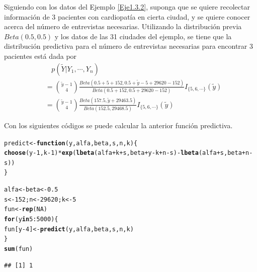 \documentclass[10pt,openright]{book}\usepackage[]{graphicx}\usepackage[]{color}
\makeatletter
\newcommand{\hlnum}[1]{\textcolor[rgb]{0.686,0.059,0.569}{#1}}%
\newcommand{\hlopt}[1]{\textcolor[rgb]{0,0,0}{#1}}%
\newcommand{\hlstd}[1]{\textcolor[rgb]{0.345,0.345,0.345}{#1}}%
\newcommand{\hlkwa}[1]{\textcolor[rgb]{0.161,0.373,0.58}{\textbf{#1}}}%
\newcommand{\hlkwb}[1]{\textcolor[rgb]{0.69,0.353,0.396}{#1}}%
\newcommand{\hlkwc}[1]{\textcolor[rgb]{0.333,0.667,0.333}{#1}}%
\newcommand{\hlkwd}[1]{\textcolor[rgb]{0.737,0.353,0.396}{\textbf{#1}}}%
\newenvironment{kframe}{%
 \def\at@end@of@kframe{}%
 \ifinner\ifhmode%
  \def\at@end@of@kframe{\end{minipage}}%
  \begin{minipage}{\columnwidth}%
 \fi\fi%
 \def\FrameCommand##1{\hskip\@totalleftmargin \hskip-\fboxsep
 \colorbox{shadecolor}{##1}\hskip-\fboxsep
     \hskip-\linewidth \hskip-\@totalleftmargin \hskip\columnwidth}%
 \MakeFramed {\advance\hsize-\width
   \@totalleftmargin\z@ \linewidth\hsize
   \@setminipage}}%
 {\par\unskip\endMakeFramed%
 \at@end@of@kframe}
\newenvironment{knitrout}{}{} %
\makeatother
\begin{document}
    \begin{Eje}
    Siguiendo con los datos del Ejemplo \ref{Eje1.3.2}, suponga que se quiere recolectar informaci\'on de 3 pacientes con cardiopat\'ia en cierta ciudad, y se quiere conocer acerca del n\'umero de entrevistas necesarias. Utilizando la distribuci\'on previa $Beta(0.5,0.5)$ y los datos de las 31 ciudades del ejemplo, se tiene que la distribuci\'on predictiva para el n\'umero de entrevistas necesarias para encontrar 3 pacientes est\'a dada por
    \begin{align*}
    &\ \ \ \ p(\tilde{Y}|Y_1,\cdots,Y_n)\\
    &=\binom{\tilde{y}-1}{4}\frac{Beta(0.5+5+152,0.5+\tilde{y}-5+29620-152)}{Beta(0.5+152,0.5+29620-152)}I_{\{5,6,\cdots\}}(\tilde{y})\\
    &=\binom{\tilde{y}-1}{4}\frac{Beta(157.5,\tilde{y}+29463.5)}{Beta(152.5,29468.5)}I_{\{5,6,\cdots\}}(\tilde{y})
    \end{align*}
    
    Con los siguientes c\'odigos se puede calcular la anterior funci\'on predictiva.
    
\begin{knitrout}
\color{fgcolor}\begin{kframe}
\begin{alltt}
\hlstd{predict}\hlkwb{<-}\hlkwa{function}\hlstd{(}\hlkwc{y}\hlstd{,}\hlkwc{alfa}\hlstd{,}\hlkwc{beta}\hlstd{,}\hlkwc{s}\hlstd{,}\hlkwc{n}\hlstd{,}\hlkwc{k}\hlstd{)\{}
  \hlkwd{choose}\hlstd{(y}\hlopt{-}\hlnum{1}\hlstd{, k}\hlopt{-}\hlnum{1}\hlstd{)} \hlopt{*} \hlkwd{exp}\hlstd{(}\hlkwd{lbeta}\hlstd{(alfa}\hlopt{+}\hlstd{k}\hlopt{+}\hlstd{s, beta}\hlopt{+}\hlstd{y}\hlopt{-}\hlstd{k}\hlopt{+}\hlstd{n}\hlopt{-}\hlstd{s)} \hlopt{-} \hlkwd{lbeta}\hlstd{(alfa}\hlopt{+}\hlstd{s, beta}\hlopt{+}\hlstd{n}\hlopt{-}\hlstd{s))}
\hlstd{\}}

\hlstd{alfa} \hlkwb{<-} \hlstd{beta} \hlkwb{<-} \hlnum{0.5}
\hlstd{s} \hlkwb{<-} \hlnum{152}\hlstd{; n} \hlkwb{<-} \hlnum{29620}\hlstd{; k} \hlkwb{<-} \hlnum{5}
\hlstd{fun} \hlkwb{<-} \hlkwd{rep}\hlstd{(}\hlnum{NA}\hlstd{)}
\hlkwa{for}\hlstd{(y} \hlkwa{in} \hlnum{5}\hlopt{:}\hlnum{5000}\hlstd{)\{}
   \hlstd{fun[y}\hlopt{-}\hlnum{4}\hlstd{]} \hlkwb{<-} \hlkwd{predict}\hlstd{(y, alfa, beta, s, n, k)}
\hlstd{\}}
\hlkwd{sum}\hlstd{(fun)}
\end{alltt}
\begin{verbatim}
## [1] 1
\end{verbatim}
\end{kframe}
\end{knitrout}
    

\end{Eje}
\end{document}
